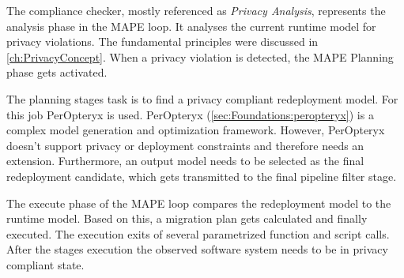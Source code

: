 The compliance checker, mostly referenced as \textit{Privacy Analysis}, represents the analysis phase in the MAPE loop. It analyses the current runtime model for privacy violations. The fundamental principles were discussed in \autoref{ch:PrivacyConcept}. When a privacy violation is detected, the MAPE Planning phase gets activated.

The planning stages task is to find a privacy compliant redeployment model. For this job PerOpteryx is used. PerOpteryx (\autoref{sec:Foundations:peropteryx}) is a complex model generation and optimization framework. However, PerOpteryx doesn't support privacy or deployment constraints and therefore needs an extension. Furthermore, an output model needs to be selected as the final redeployment candidate, which gets transmitted to the final pipeline filter stage.

The execute phase of the MAPE loop compares the redeployment model to the runtime model. Based on this, a migration plan gets calculated and finally executed. The execution exits of several parametrized function and script calls. After the stages execution the observed software system needs to be in privacy compliant state.


